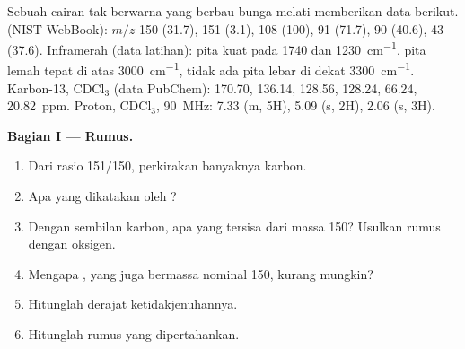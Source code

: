 \begin{problem}
\label{pb:b2:structure-determination:1}
Sebuah cairan tak berwarna yang berbau bunga melati memberikan data
berikut.  (NIST
WebBook): $m/z$ 150 (31.7), 151 (3.1), 108 (100), 91 (71.7), 90 (40.6), 43
(37.6). Inframerah (data latihan): pita kuat pada 1740 dan
\qty{1230}{cm^{-1}}, pita lemah tepat di atas \qty{3000}{cm^{-1}}, tidak ada
pita lebar di dekat \qty{3300}{cm^{-1}}. Karbon-13, CDCl$_3$ (data PubChem): 170.70, 136.14, 128.56,
128.24, 66.24, 20.82~ppm. Proton, CDCl$_3$, \qty{90}{MHz}: 7.33 (m, 5H), 5.09 (s, 2H), 2.06 (s, 3H).

\begin{center}
\end{center}

\medskip
\noindent\textbf{Bagian I --- Rumus.}
\begin{enumerate}
  \item Dari rasio 151/150, perkirakan banyaknya karbon.
  \item Apa yang dikatakan oleh ?
  \item Dengan sembilan karbon, apa yang tersisa dari massa 150? Usulkan
        rumus dengan oksigen.
  \item Mengapa , yang juga bermassa nominal 150, kurang mungkin?
  \item Hitunglah derajat ketidakjenuhannya.
  \item Hitunglah  rumus yang dipertahankan.
\end{enumerate}


\end{problem}
